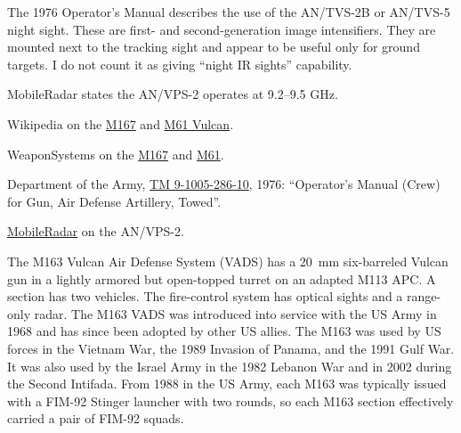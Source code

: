\begin{withcounters}
{        The 1976 Operator's Manual describes the use of the AN/TVS-2B or AN/TVS-5 night sight. These are first- and second-generation image intensifiers. They are mounted next to the tracking sight and appear to be useful only for ground targets. I do not count it as giving “night IR sights” capability.

        MobileRadar states the AN/VPS-2 operates at 9.2--9.5 GHz.

        \begin{notesources}
            \item Wikipedia on the \href{https://en.wikipedia.org/wiki/M167_VADS}{M167} and \href{https://en.wikipedia.org/wiki/M61_Vulcan}{M61 Vulcan}.
            \item WeaponSystems on the \href{https://weaponsystems.net/system/150-M167+Vulcan}{M167} and \href{https://weaponsystems.net/system/1510-20mm\%20M61\%20Vulcan}{M61}.
            \item Department of the Army, \href{https://archive.org/details/TM9-1005-286-10/mode/2up}{TM 9-1005-286-10}, 1976: “Operator's Manual (Crew) for Gun, Air Defense Artillery, Towed”.
            \item \href{https://www.mobileradar.org/radar_descptn_3.html}{MobileRadar} on the AN/VPS-2.
        \end{notesources}
    }


    The M163 Vulcan Air Defense System (VADS) has a 20~mm six-barreled Vulcan gun in a lightly armored but open-topped turret on an adapted M113 APC. A section has two vehicles. The fire-control system has optical sights and a range-only radar.
    The M163 VADS was introduced into service with the US Army in 1968 and has since been adopted by other US allies. The M163 was used by US forces in the Vietnam War, the 1989 Invasion of Panama, and the 1991 Gulf War. It was also used by the Israel Army in the 1982 Lebanon War and in 2002 during the Second Intifada.
    From 1988 in the US Army, each M163 was typically issued with a FIM-92 Stinger launcher with two rounds, so each M163 section effectively carried a pair of FIM-92 squads.%
\end{withcounters}
